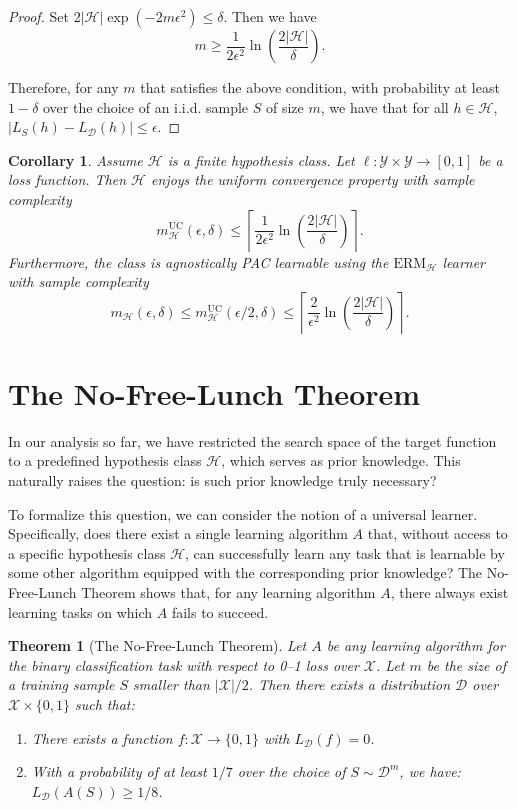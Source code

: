 \documentclass[openany, amssymb, psamsfonts]{amsart}
\newtheorem{thm}{Theorem}[section]
\newtheorem{cor}{Corollary}[section]
\theoremstyle{definition}
\numberwithin{equation}{section}
\begin{document}
\begin{proof}
Set $2|\mathcal{H}|\exp\left(-2 m \epsilon^2 \right) \leq \delta$. Then we have
\[m \geq \frac{1}{2 \epsilon^2} \ln\left( \frac{2|\mathcal{H}|}{\delta} \right).\] 

Therefore, for any $m$ that satisfies the above condition, with probability at least $1-\delta$ over the choice of an i.i.d. sample $S$ of size $m$, we have that for all $h \in \mathcal{H}$, $|L_S(h) - L_{\mathcal{D}}(h)| \leq \epsilon$.
\end{proof}

\begin{cor} \label{corollary: finite hypothesis class enjoys uniform convergence property}
Assume $\mathcal{H}$ is a finite hypothesis class. Let $\ell \colon \mathcal{Y} \times \mathcal{Y} \to [0,1]$ be a loss function. Then $\mathcal{H}$ enjoys the uniform convergence property with sample complexity
\[
m_{\mathcal{H}}^{\text{UC}}(\epsilon, \delta) \leq \left\lceil \frac{1}{2 \epsilon^2} \ln\left( \frac{2|\mathcal{H}|}{\delta} \right)\right\rceil.
\]
Furthermore, the class is agnostically PAC learnable using the $\mathrm{ERM}_\mathcal{H}$ learner with sample complexity
\[
m_{\mathcal{H}}(\epsilon, \delta) \leq m_{\mathcal{H}}^{\text{UC}}(\epsilon/2, \delta) \leq \left\lceil \frac{2}{\epsilon^2} \ln\left( \frac{2|\mathcal{H}|}{\delta} \right) \right\rceil.
\]
\end{cor}

\section{The No-Free-Lunch Theorem}
In our analysis so far, we have restricted the search space of the target function to a predefined hypothesis class 
$\mathcal{H}$, which serves as prior knowledge. This naturally raises the question: is such prior knowledge truly necessary?

To formalize this question, we can consider the notion of a universal learner. Specifically, does there exist a single learning algorithm 
$A$ that, without access to a specific hypothesis class $\mathcal{H}$, can successfully learn any task that is learnable by some other algorithm equipped with the corresponding prior knowledge? The No-Free-Lunch Theorem shows that, for any learning algorithm $A$, there always exist learning tasks on which $A$ fails to succeed.

\begin{thm}[The No-Free-Lunch Theorem]\label{theorem: no free lunch}
Let $A$ be any learning algorithm for the binary classification task with respect to 0--1 loss over $\mathcal{X}$. Let $m$ be the size of a training sample $S$ smaller than $|\mathcal{X}|/2$. Then there exists a distribution $\mathcal{D}$ over $\mathcal{X} \times \{0, 1\}$ such that:

\begin{enumerate}
    \item There exists a function $f \colon \mathcal{X} \to \{0, 1\}$ with $L_{\mathcal{D}}(f) = 0$.
    \item With a probability of at least $1/7$ over the choice of $S \sim \mathcal{D}^m$, we have: $L_{\mathcal{D}}(A(S)) \geq 1/8$.
\end{enumerate}
\end{thm}
\end{document}
